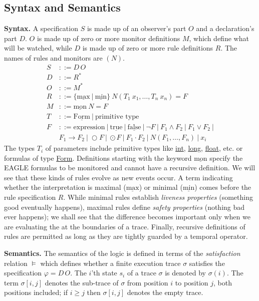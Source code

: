 \documentclass[english]{article}
\begin{document}
\subsection{Syntax and Semantics}
\textbf{Syntax.}
A specification $S$ is made up of an observer's part $O$ and a declaration's part $D$. $O$ is made up of zero or more monitor definitions $M$, which define what will be watched, while $D$ is made up of zero or more rule definitions $R$. The names of rules and monitors are $(N)$.
\begin{align*}
    S &::= D \, O \\
    D &::= R^* \\
    O &::= M^* \\
    R &::= \{\underline{\text{max}}\ |\ \underline{\text{min}} \}\ N(T_1\ x_1, \ldots, T_n\ x_n) = F \\
    M &::= \underline{\text{mon}}\ N = F \\
    T &::= \underline{\text{Form}}\ |\ \text{primitive type} \\
    F &::= \text{expression}\ |\ \underline{\text{true}}\ |\ \underline{\text{false}}\ |\ \neg F\ |\ F_1 \land F_2\ |\ F_1 \lor F_2\ |\\
            &F_1 \rightarrow F_2\ |\ \bigcirc F\ |\ \odot F\ |\ F_1 \cdot F_2\ |\ N(F_1, \ldots, F_n)\ |\ x_i
\end{align*}
The types $T_i$ of parameters include primitive types like \underline{int}, \underline{long}, \underline{float}, etc. or formulas of type \underline{Form}. Definitions starting with the keyword $\underline{\text{mon}}$ specify the EAGLE formulas to be monitored and cannot have a recursive definition. We will see that these kinds of rules evolve as new events occur. 
A term indicating whether the interpretation is maximal ($\underline{\text{max}}$) or minimal ($\underline{\text{min}}$) comes before the rule specification $R$. While minimal rules establish \textit{liveness properties} (something good eventually happens), maximal rules define \textit{safety properties} (nothing bad ever happens); we shall see that the difference becomes important only when we are evaluating the at the boundaries of a trace. Finally, recursive definitions of rules are permitted as long as they are tightly guarded by a temporal operator. 

\textbf{Semantics.} The semantics of the logic is defined in terms of the \textit{satisfaction} relation $\models$ which defines whether a finite execution trace $\sigma$ satisfies the specification $\varphi=D \, O$. The $i$'th state $s_i$ of a trace $\sigma$ is denoted by $\sigma(i)$. The term $\sigma[i, j]$ denotes the sub-trace of $\sigma$ from position $i$ to position $j$, both positions included; if $i \geq j$ then $\sigma[i, j]$ denotes the empty trace.
\end{document}

